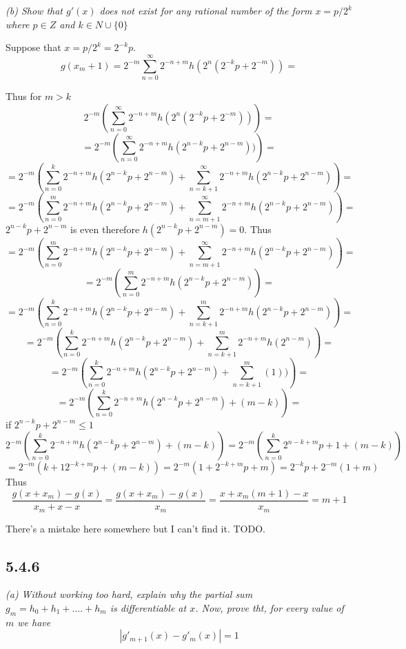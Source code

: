 \documentclass[11pt,oneside,titlepage]{book}
\begin{document}
\textit{(b) Show that $g'(x)$ does not exist for any rational number of the
  form $x = p/2^k$ where $p \in Z$ and $k \in N \cup \{0\}$}

Suppose that $x = p/2^k = 2^{-k}p$.
$$g(x_m + 1) =
2^{-m}\sum_{n = 0}^{\infty}{2^{-n + m} h(2^{n}(2^{-k}p + 2^{-m}))} =
$$

Thus for $m > k$
$$
2^{-m}
\left(\sum_{n = 0}^{\infty}{2^{-n + m} h(2^{n}(2^{-k}p + 2^{-m}))}\right) =
$$
$$
= 2^{-m}
\left(\sum_{n = 0}^{\infty}{2^{-n + m} h(2^{n -k}p + 2^{n-m}))}\right) =
$$
$$
= 2^{-m}
\left(\sum_{n = 0}^{k}{2^{-n + m} h(2^{n -k}p + 2^{n-m})} +
  \sum_{n = k + 1}^{\infty}{2^{-n + m} h(2^{n -k}p + 2^{n-m})}\right) =
$$
$$
= 2^{-m}
\left(\sum_{n = 0}^{m}{2^{-n + m} h(2^{n -k}p + 2^{n-m})} +
  \sum_{n = m + 1}^{\infty}{2^{-n + m} h(2^{n -k}p + 2^{n-m})}\right) =
$$
$2^{n -k}p + 2^{n-m}$ is even therefore $h(2^{n -k}p + 2^{n-m}) = 0$.  Thus
$$
= 2^{-m}
\left(\sum_{n = 0}^{m}{2^{-n + m} h(2^{n -k}p + 2^{n-m})} +
  \sum_{n = m + 1}^{\infty}{2^{-n + m} h(2^{n -k}p + 2^{n-m})}\right) =
$$
$$
= 2^{-m}
\left(\sum_{n = 0}^{m}{2^{-n + m} h(2^{n -k}p + 2^{n-m})} \right) =
$$
$$
= 2^{-m}
\left(\sum_{n = 0}^{k}{2^{-n + m} h(2^{n -k}p + 2^{n-m})} +
  \sum_{n = k + 1}^{m}{2^{-n + m} h(2^{n -k}p + 2^{n-m})}
\right) =
$$
$$
= 2^{-m}
\left(\sum_{n = 0}^{k}{2^{-n + m} h(2^{n -k}p + 2^{n-m})} +
  \sum_{n = k + 1}^{m}{2^{-n + m} h(2^{n-m})}
\right) =
$$
$$
= 2^{-m}
\left(\sum_{n = 0}^{k}{2^{-n + m} h(2^{n -k}p + 2^{n-m})} +
  \sum_{n = k + 1}^{m}{(1))}
\right) =
$$
$$
= 2^{-m}
\left(\sum_{n = 0}^{k}{2^{-n + m} h(2^{n -k}p + 2^{n-m})} +
(m - k)
\right)=
$$
if $2^{n -k}p + 2^{n-m} \leq 1$
$$
2^{-m}
\left(\sum_{n = 0}^{k}{2^{-n + m} h(2^{n -k}p + 2^{n-m})} +
(m - k)
\right) = 2^{-m}
\left(\sum_{n = 0}^{k}{2^{n -k + m}p + 1} + (m - k)
\right) 
$$
$$=2^{-m} \left(k + 1 2^{-k + m}p + (m - k) \right)
=2^{-m} \left( 1 + 2^{-k + m}p + m \right)
=2^{-k}p + 2^{-m} ( 1  + m)
$$
Thus
$$\frac{g(x + x_m) - g(x)}{x_m + x - x} = \frac{g(x + x_m) - g(x)}{x_m} =
\frac{x + x_m(m + 1) - x}{x_m} =
m + 1$$

There's a mistake here somewhere but I can't find it. TODO.


\subsection*{5.4.6}
\textit{(a) Without working too hard, explain why the partial sum
  $g_m = h_0 + h_1 + .... + h_m$ is differentiable at $x$. Now, prove tht,
  for every value of $m$ we have}
$$|g'_{m + 1}(x) - g'_m(x)| = 1$$
\end{document}
